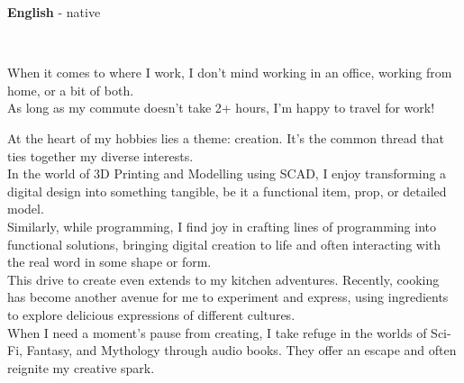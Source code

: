 \documentclass[9pt]{developercv} %
\begin{document}
\begin{minipage}[t]{0.3\textwidth}
	\vspace{-\baselineskip} %

	
	\textbf{English} - native\\


	
	  \\

	\begin{minipage}[t]{0.8\textwidth}
		When it comes to where I work, I don't mind working in an office, working from home, or a bit of both.\\ 

		As long as my commute doesn't take 2+ hours,  I'm happy to travel for work!
	\end{minipage}
\end{minipage}
\hfill
\begin{minipage}[t]{0.7\textwidth}
	\vspace{-\baselineskip} %
	
	
	At the heart of my hobbies lies a theme: creation. 
	It's the common thread that ties together my diverse interests. \\

	In the world of 3D Printing and Modelling using SCAD, I enjoy transforming a digital design into something tangible, be it a functional item, prop, or detailed model. \\

	Similarly, while programming, I find joy in crafting lines of programming into functional solutions, bringing digital creation to life and often interacting with the real word in some shape or form. \\

	This drive to create even extends to my kitchen adventures. Recently, cooking has become another avenue for me to experiment and express, using ingredients to explore delicious expressions of different cultures.\\

	When I need a moment's pause from creating, I take refuge in the worlds of Sci-Fi, Fantasy, and Mythology through audio books. They offer an escape and often reignite my creative spark.


\end{minipage}
\end{document}
